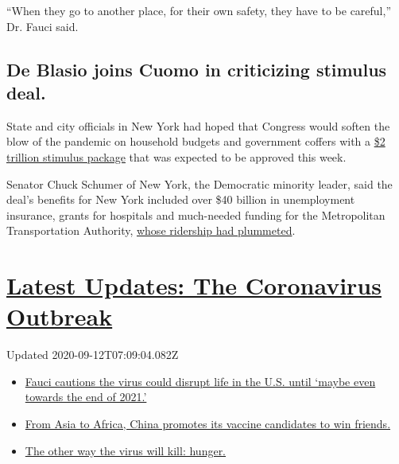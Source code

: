 ``When they go to another place, for their own safety, they have to be
careful,'' Dr. Fauci said.

\hypertarget{de-blasio-joins-cuomo-in-criticizing-stimulus-deal-}{%
\subsection{De Blasio joins Cuomo in criticizing stimulus deal.
}\label{de-blasio-joins-cuomo-in-criticizing-stimulus-deal-}}

State and city officials in New York had hoped that Congress would
soften the blow of the pandemic on household budgets and government
coffers with a
\href{https://www.nytimes3xbfgragh.onion/2020/03/25/us/politics/coronavirus-senate-deal.html}{\$2
trillion stimulus package} that was expected to be approved this week.

Senator Chuck Schumer of New York, the Democratic minority leader, said
the deal's benefits for New York included over \$40 billion in
unemployment insurance, grants for hospitals and much-needed funding for
the Metropolitan Transportation Authority,
\href{https://www.nytimes3xbfgragh.onion/2020/03/24/nyregion/coronavirus-nyc-mta-cuts-.html}{whose
ridership had plummeted}.

\hypertarget{latest-updates-the-coronavirus-outbreak}{%
\section{\texorpdfstring{\href{https://www.nytimes3xbfgragh.onion/2020/09/11/world/covid-19-coronavirus.html?action=click\&pgtype=Article\&state=default\&region=MAIN_CONTENT_1\&context=storylines_live_updates}{Latest
Updates: The Coronavirus
Outbreak}}{Latest Updates: The Coronavirus Outbreak}}\label{latest-updates-the-coronavirus-outbreak}}

Updated 2020-09-12T07:09:04.082Z

\begin{itemize}
\tightlist
\item
  \href{https://www.nytimes3xbfgragh.onion/2020/09/11/world/covid-19-coronavirus.html?action=click\&pgtype=Article\&state=default\&region=MAIN_CONTENT_1\&context=storylines_live_updates\#link-dfb8a16}{Fauci
  cautions the virus could disrupt life in the U.S. until `maybe even
  towards the end of 2021.'}
\item
  \href{https://www.nytimes3xbfgragh.onion/2020/09/11/world/covid-19-coronavirus.html?action=click\&pgtype=Article\&state=default\&region=MAIN_CONTENT_1\&context=storylines_live_updates\#link-7104d154}{From
  Asia to Africa, China promotes its vaccine candidates to win friends.}
\item
  \href{https://www.nytimes3xbfgragh.onion/2020/09/11/world/covid-19-coronavirus.html?action=click\&pgtype=Article\&state=default\&region=MAIN_CONTENT_1\&context=storylines_live_updates\#link-393ad215}{The
  other way the virus will kill: hunger.}
\end{itemize}

